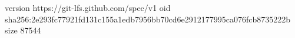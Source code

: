 version https://git-lfs.github.com/spec/v1
oid sha256:2e293fc77921fd131c155a1edb7956bb70cd6e2912177995ca076fcb8735222b
size 87544
